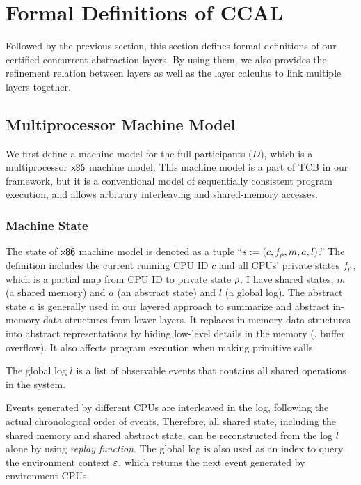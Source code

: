 \section{Formal Definitions of CCAL}
\label{chapter:ccal:sec:interface-calculus}

Followed by the previous section, 
this section defines formal definitions of our certified concurrent abstraction layers.
By using them, 
we also provides 
the refinement relation between layers
as well as the layer calculus to link multiple layers together.


\subsection{Multiprocessor Machine Model}
\label{boot-total}

We first define a machine model for the full participants ($D$), which is a multiprocessor $\mathsf{x86}$ machine model. 
This machine model is a part of TCB in our framework, but 
it  is a conventional model of sequentially consistent program
execution, and allows arbitrary interleaving
and shared-memory
accesses. 


\subsubsection{Machine State} 
The state of  $\mathsf{x86}$ machine model is denoted as a tuple ``$s := (c, f_\rho, m, a, l)$.''
The definition includes
the current running CPU ID $c$ and 
all CPUs' private states $f_\rho$, which is a partial map from CPU ID to  private state $\rho$.
I have shared states,
$m$ (a shared memory) and $a$ (an abstract state)
and $l$ (a global log).
The abstract state $a$  is generally used in our layered approach to
summarize and abstract in-memory data structures from lower layers.
It replaces in-memory data structures into abstract representations 
by hiding low-level details in the memory (\eg. buffer overflow). 
It also affects program execution when making primitive calls. 

The global log $l$ is a list of observable events 
that contains all shared operations in the system. 


Events generated by different CPUs are
interleaved in the log, following the actual chronological order of events.
Therefore, all shared state, including the shared memory
and shared abstract state, can be reconstructed
from the log $l$ alone by using \emph{replay function}.
The global log is also used as an index to query the environment context
$\oracle$, which returns the next event generated by environment CPUs.





